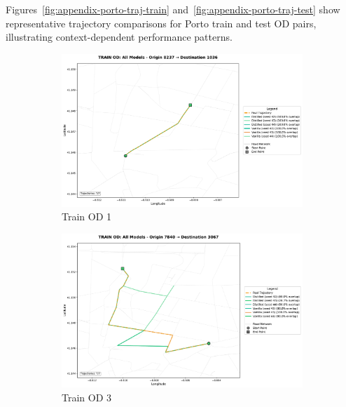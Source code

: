Figures~\ref{fig:appendix-porto-traj-train} and~\ref{fig:appendix-porto-traj-test} show representative trajectory comparisons for Porto train and test OD pairs, illustrating context-dependent performance patterns.

\begin{figure}[H]
    \centering
    \begin{subfigure}{0.49\linewidth}
        \centering
        \includegraphics[width=\linewidth]{assets/plots/eval/porto/trajectories/train_od_comparison_1_origin8237_dest1036.pdf}
        \caption{Train OD 1}
    \end{subfigure}
    \begin{subfigure}{0.49\linewidth}
        \centering
        \includegraphics[width=\linewidth]{assets/plots/eval/porto/trajectories/train_od_comparison_3_origin7840_dest3067.pdf}
        \caption{Train OD 3}
    \end{subfigure}
    \begin{subfigure}{0.49\linewidth}

\end{subfigure}
\end{figure}

